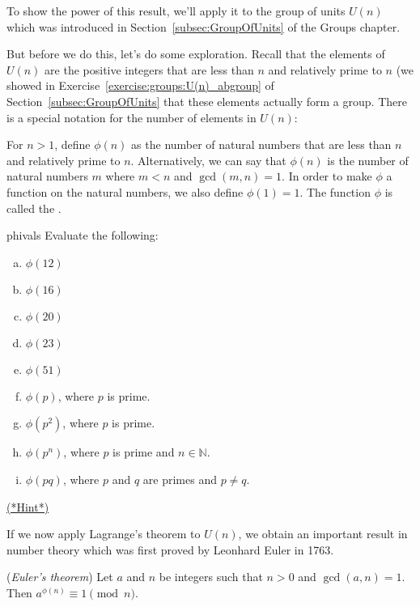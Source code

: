 {To show the power of this result, we'll apply it to  the group of units $U(n)$ which was introduced in 
Section~\ref{subsec:GroupOfUnits} of the Groups chapter.

But before we do this, let's do some exploration. Recall that the elements of $U(n)$ are the positive integers that are less than $n$ and relatively prime to $n$ (we showed in Exercise~\ref{exercise:groups:U(n)_abgroup} of Section~\ref{subsec:GroupOfUnits} that these elements actually form a group. There is a special notation for the number of elements in $U(n)$:

\begin{defn}
For $n>1$, define $\phi(n)$ as the number of natural numbers that are less than $n$ and relatively prime to $n$. Alternatively, we can say that  $\phi(n)$ is the number of natural numbers $m$ where  $m < n$ and $\gcd(m,n) = 1$. In order to make $\phi$ a function on the natural numbers, we also define $\phi(1)=1$. 
The function $\phi$ is called the .
\end{defn}


\begin{exercise}{phivals}
Evaluate the following:
\begin{multicols}{2}
\begin{enumerate}[(a)]
\item
$\phi(12)$
\item
$\phi(16)$
\item
$\phi(20)$
\item
$\phi(23)$
\item
$\phi(51)$
\item
$\phi(p)$, where $p$ is prime.
\item\label{p2}
$\phi(p^2)$, where $p$ is prime. \item
$\phi(p^n)$, where $p$ is prime and $n \in {\mathbb N}$.
\item
$\phi(pq)$, where $p$ and $q$ are primes and $p \neq q$.
\end{enumerate}
\end{multicols}
\noindent
\hyperref[sec:cosets:hints]{(*Hint*)}
\end{exercise}


If we now apply Lagrange's theorem to $U(n)$, we obtain an important result in number theory which was first proved by Leonhard Euler in 1763. 

\begin{thm} (\emph{Euler's theorem}) \label{cosets:Eulers_theorem}
Let $a$ and $n$ be integers such that $n>0$ and $\gcd(a, n) = 1$.  Then $a^{\phi(n)} \equiv 1 \pmod{n}$.
\end{thm}

}
